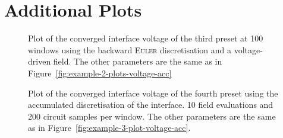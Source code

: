 
\chapter{Additional Plots}

\begin{figure}[htbp]
  \centering
  
  \caption{Plot of the converged interface voltage of the third preset at 100 windows using the backward \textsc{Euler} discretisation and a voltage-driven field. The other parameters are the same as in Figure~\ref{fig:example-2-plots-voltage-acc}}
  \label{fig:example-2-plot-voltage}
\end{figure}

\begin{figure}[htbp]
  \centering
  
  \caption{Plot of the converged interface voltage of the fourth preset using the accumulated discretisation of the interface. 10 field evaluations and 200 circuit samples per window. The other parameters are the same as in Figure~\ref{fig:example-3-plot-voltage-acc}.}
  \label{fig:example-3-plot-voltage-acc-better}
\end{figure}